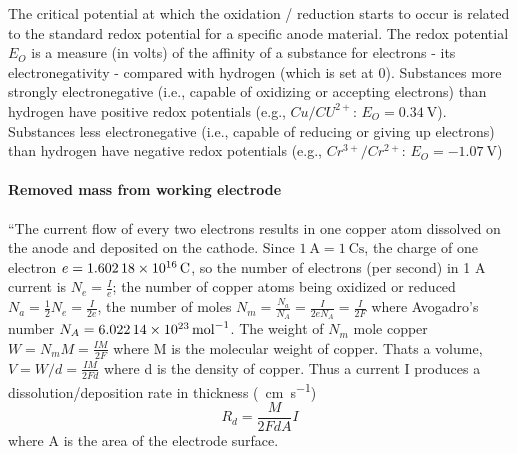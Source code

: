 The critical potential at which the oxidation / reduction starts to occur is related to the standard redox potential for a specific anode material. The redox potential $E_O$ is a measure (in volts) of the affinity of a substance for electrons - its electronegativity - compared with hydrogen (which is set at 0). Substances more strongly electronegative (i.e., capable of oxidizing or accepting electrons) than hydrogen have positive redox potentials (e.g., $Cu/CU^{2+}$: $E_O = \SI{0.34}{\volt}$). Substances less electronegative (i.e., capable of reducing or giving up electrons) than hydrogen have negative redox potentials (e.g., $Cr^{3+}/Cr^{2+}$: $E_O = \SI{-1.07}{\volt}$)\cite{jinshan_electrochemical_2004}

\paragraph{Removed mass from working electrode}
``The current flow of every two electrons results in one copper atom dissolved on the anode and deposited on the cathode. Since $\SI{1}{\ampere}= \SI{1}{\coulomb \second}$, the charge of one electron $e = \SI{1.60218E16}{\coulomb}$, so the number of electrons (per second) in 1 A current is $N_e = \frac{I}{e}$; the number of copper atoms being oxidized or reduced $N_a= \frac{1}{2} N_e= \frac{I}{2e}$, the number of moles $N_m = \frac{N_a}{N_A} = \frac{I}{2eN_A}= \frac{I}{2F}$ where Avogadro's number $N_A = \SI{6.02214E23}{\per \mole}$. The weight of $N_m$ mole copper $W = N_m M = \frac{IM}{2 F}$ where M is the molecular weight of copper. Thats a volume, $V = W / d =\frac{IM}{2 F d}$ where d is the density of copper. Thus a current I produces a dissolution/deposition rate in thickness (\SI{}{\centi\meter \per \second}) \begin{equation} R_d=\frac{M}{2 FdA}I \label{dissolution-rate}\end{equation}
where A is the area of the electrode surface.
\cite[34]{jinshan_electrochemical_2004}

